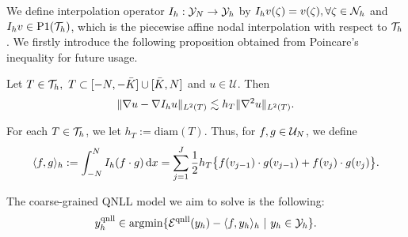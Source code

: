 We define interpolation operator $I_h: \mathcal{Y}_{N} \rightarrow \mathcal{Y}_{h}$ by $I_{h} v(\zeta) =v(\zeta), \forall \zeta \in \mathcal{N}_{h}$ and $I_{h} v \in \text{P1} (\mathcal{T}_{h})$, which is the piecewise affine nodal interpolation with respect to $\mathcal{T}_{h}$. We firstly introduce the following proposition obtained from Poincare's inequality for future usage.

\begin{proposition}
	Let $T\in \mathcal{T}_{h} , \ T \subset [-N,-\bar{K}]\cup[\bar{K},N]$ and $u\in \mathscr{U}$. Then
	\begin{equation*}
		\Vert \nabla u-\nabla I_{h} u\Vert_{L^{2}(T)}\lesssim h_{T} \Vert \nabla^{2} u\Vert_{L^{2}(T)}.
	\end{equation*}
\end{proposition}

	
	

For each $T\in \mathcal{T}_{h}$, we let $h_{T}:=\text{diam} (T)$. Thus, for $f,g \in \mathcal{U}_{N}$, we define 
\begin{equation*}
	\langle f,g\rangle_{h}:= \int_{-N}^{N} I_{h} (f\cdot g)\,\text{d} x=\sum_{j=1}^{J} \frac{1}{2} h_{T}\big\{f(v_{j-1})\cdot g(v_{j-1}) + f(v_{j})\cdot g(v_{j})\big\}.
\end{equation*}

The coarse-grained QNLL model we aim to solve is the following: 
\begin{equation}
	\label{Yh solution}
	\yh \in \argm \{\El (y_{h})-\langle f,y_{h} \rangle_{h}\ | \ y_{h}\in \YhNL\}.
\end{equation}

